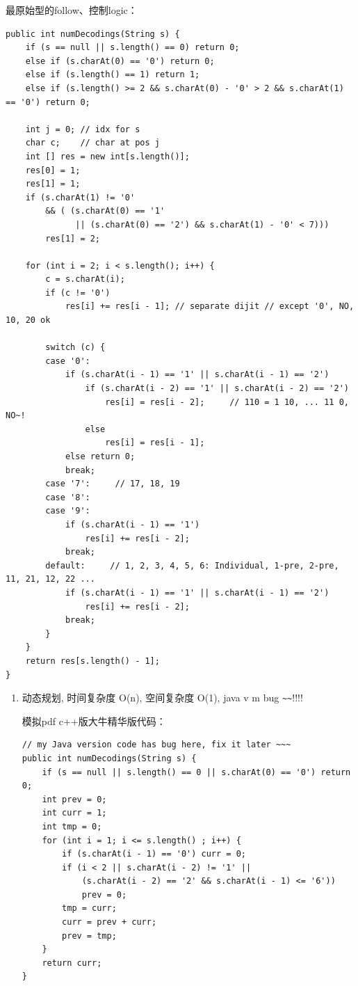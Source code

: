\documentclass[12pt]{book}
\begin{document}
最原始型的follow、控制logic：
\lstset{language=java,label= ,caption= ,numbers=none}
\begin{lstlisting}
public int numDecodings(String s) {
    if (s == null || s.length() == 0) return 0;
    else if (s.charAt(0) == '0') return 0;
    else if (s.length() == 1) return 1;
    else if (s.length() >= 2 && s.charAt(0) - '0' > 2 && s.charAt(1) == '0') return 0;
            
    int j = 0; // idx for s
    char c;    // char at pos j
    int [] res = new int[s.length()];
    res[0] = 1;
    res[1] = 1;
    if (s.charAt(1) != '0'
        && ( (s.charAt(0) == '1'
              || (s.charAt(0) == '2') && s.charAt(1) - '0' < 7)))
        res[1] = 2;
            
    for (int i = 2; i < s.length(); i++) {
        c = s.charAt(i);
        if (c != '0')
            res[i] += res[i - 1]; // separate dijit // except '0', NO, 10, 20 ok

        switch (c) {
        case '0':
            if (s.charAt(i - 1) == '1' || s.charAt(i - 1) == '2')
                if (s.charAt(i - 2) == '1' || s.charAt(i - 2) == '2')
                    res[i] = res[i - 2];     // 110 = 1 10, ... 11 0, NO~!
                else
                    res[i] = res[i - 1]; 
            else return 0;
            break;
        case '7':     // 17, 18, 19
        case '8':
        case '9':
            if (s.charAt(i - 1) == '1')
                res[i] += res[i - 2];
            break;
        default:     // 1, 2, 3, 4, 5, 6: Individual, 1-pre, 2-pre, 11, 21, 12, 22 ...
            if (s.charAt(i - 1) == '1' || s.charAt(i - 1) == '2')
                res[i] += res[i - 2];
            break;
        }
    }
    return res[s.length() - 1];
}
\end{lstlisting}
\begin{enumerate}
\item 动态规划, 时间复杂度 O(n), 空间复杂度 O(1), java v m bug \verb,~~,!!!!
\label{sec-14-2-8-1}

模拟pdf c++版大牛精华版代码： 
\lstset{language=java,label= ,caption= ,numbers=none}
\begin{lstlisting}
// my Java version code has bug here, fix it later ~~~
public int numDecodings(String s) {
    if (s == null || s.length() == 0 || s.charAt(0) == '0') return 0;
    int prev = 0;
    int curr = 1;
    int tmp = 0;
    for (int i = 1; i <= s.length() ; i++) {
        if (s.charAt(i - 1) == '0') curr = 0;
        if (i < 2 || s.charAt(i - 2) != '1' ||
            (s.charAt(i - 2) == '2' && s.charAt(i - 1) <= '6'))
            prev = 0;
        tmp = curr;
        curr = prev + curr;
        prev = tmp;
    }
    return curr;
}
\end{lstlisting}
\end{enumerate}
\end{document}
